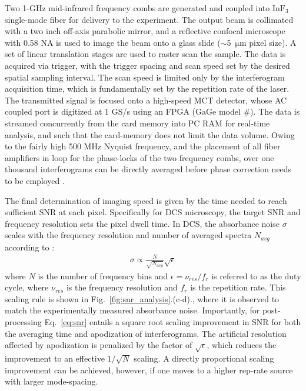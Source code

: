 \documentclass{optica-article}
\begin{document}
Two 1-GHz mid-infrared frequency combs are generated and coupled into $\mathrm{InF_3}$ single-mode fiber for delivery to the experiment. The output beam is collimated with a two inch off-axis parabolic mirror, and a reflective confocal microscope with 0.58 NA is used to image the beam onto a glass slide (\mbox{$\sim$5 $\mathrm{\mu m}$} pixel size). A set of linear translation stages are used to raster scan the sample. The data is acquired via trigger, with the trigger spacing and scan speed set by the desired spatial sampling interval. The scan speed is limited only by the interferogram acquisition time, which is fundamentally set by the repetition rate of the laser. The transmitted signal is focused onto a high-speed MCT detector, whose AC coupled port is digitized at 1 GS/s using an FPGA (GaGe model \#). The data is streamed concurrently from the card memory into PC RAM for real-time analysis, and such that the card-memory does not limit the data volume. Owing to the fairly high 500 MHz Nyquist frequency, and the placement of all fiber amplifiers in loop for the phase-locks of the two frequency combs, over one thousand interferograms can be directly averaged before phase correction needs to be employed \cite{hebertSelfcorrectedChipbasedDualcomb2017,hebertSelfCorrectionLimitsDualComb2019}.

The final determination of imaging speed is given by the time needed to reach sufficient SNR at each pixel. Specifically for DCS microscopy, the target SNR and frequency resolution sets the pixel dwell time. In DCS, the absorbance noise $\sigma$ scales with the frequency resolution and number of averaged spectra $N_{avg}$ according to \cite{newburySensitivityCoherentDualcomb2010}: 
% 
\begin{align}
    \sigma \propto \frac{N}{\sqrt{N_{avg}}}\sqrt{\epsilon}
    \label{eq:snr}
\end{align}
% 
where $N$ is the number of frequency bins and $\epsilon=\nu_{res}/f_{r}$ is referred to as the duty cycle, where $\nu_{res}$ is the frequency resolution and $f_r$ is the repetition rate. This scaling rule is shown in \mbox{Fig. \ref{fig:snr_analysis}.(c-d).}, where it is observed to match the experimentally measured absorbance noise. Importantly, for post-processing \mbox{Eq. \ref{eq:snr}} entails a square root scaling improvement in SNR for both the averaging time and apodization of interferograms. The artificial resolution affected by apodization is penalized by the factor of $\sqrt{\epsilon}$, which reduces the improvement to an effective $1/\sqrt{N}$ scaling. A directly proportional scaling improvement can be achieved, however, if one moves to a higher rep-rate source with larger mode-spacing.
\end{document}
